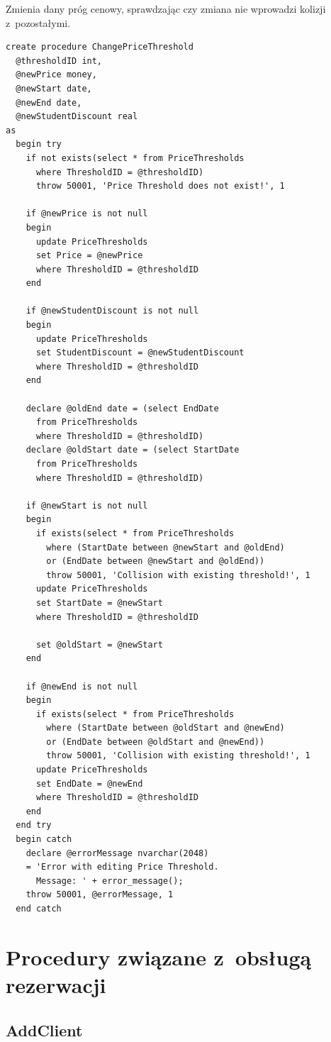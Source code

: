 \documentclass[12pt, a4paper]{mwrep}
\begin{document}
\noindent Zmienia dany próg cenowy, sprawdzając czy zmiana nie wprowadzi kolizji z~pozostałymi.

\begin{lstlisting}
create procedure ChangePriceThreshold
  @thresholdID int,
  @newPrice money,
  @newStart date,
  @newEnd date,
  @newStudentDiscount real
as
  begin try
    if not exists(select * from PriceThresholds 
      where ThresholdID = @thresholdID)
      throw 50001, 'Price Threshold does not exist!', 1

    if @newPrice is not null
    begin
      update PriceThresholds
      set Price = @newPrice
      where ThresholdID = @thresholdID
    end

    if @newStudentDiscount is not null
    begin
      update PriceThresholds
      set StudentDiscount = @newStudentDiscount
      where ThresholdID = @thresholdID
    end

    declare @oldEnd date = (select EndDate 
      from PriceThresholds 
      where ThresholdID = @thresholdID)
    declare @oldStart date = (select StartDate 
      from PriceThresholds 
      where ThresholdID = @thresholdID)

    if @newStart is not null
    begin
      if exists(select * from PriceThresholds 
        where (StartDate between @newStart and @oldEnd) 
        or (EndDate between @newStart and @oldEnd))
        throw 50001, 'Collision with existing threshold!', 1
      update PriceThresholds
      set StartDate = @newStart
      where ThresholdID = @thresholdID

      set @oldStart = @newStart
    end

    if @newEnd is not null
    begin
      if exists(select * from PriceThresholds 
        where (StartDate between @oldStart and @newEnd) 
        or (EndDate between @oldStart and @newEnd))
        throw 50001, 'Collision with existing threshold!', 1
      update PriceThresholds
      set EndDate = @newEnd
      where ThresholdID = @thresholdID
    end
  end try
  begin catch
    declare @errorMessage nvarchar(2048)
    = 'Error with editing Price Threshold. 
      Message: ' + error_message();
    throw 50001, @errorMessage, 1
  end catch
\end{lstlisting}

\section{Procedury związane z~obsługą rezerwacji}

\subsection{AddClient}
\end{document}
